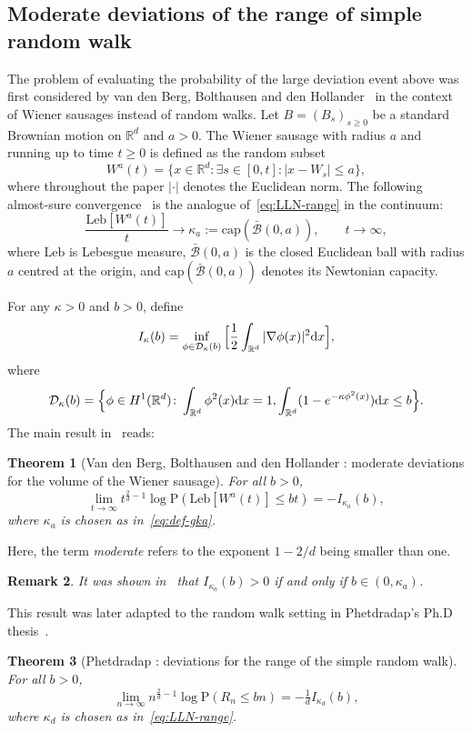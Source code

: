 \documentclass[a4paper,11pt]{amsart}
\numberwithin{equation}{section}
\newtheorem{theorem}{Theorem}[section]
\newtheorem{remark}[theorem]{Remark}
\newcommand{\bbR}{{\ensuremath{\mathbb R}} }
\newcommand{\cB}{{\ensuremath{\mathcal B}} }
\newcommand{\cD}{{\ensuremath{\mathcal D}} }
\newcommand{\gk}{\kappa}
\newcommand{\dd}{\text{\rm d}}             %
\newcommand\bP{\ensuremath{\mathrm{P}}}
\newcommand{\8}{\infty}
\newcommand{\cp}{\mathrm{cap}}
\newcommand{\beq}{\begin{equation}}
\newcommand{\eeq}{\end{equation}}
\newcommand{\leb}{\mathrm{Leb}}
\begin{document}
\subsection{Moderate deviations of the range of simple random walk}
%
\par The problem of evaluating the probability of the large deviation event above was first considered by van den Berg, Bolthausen and den Hollander~\cite{BBH2001} in the context of Wiener sausages instead of random walks. Let $B = (B_s)_{s\ge 0}$ be a standard Brownian motion on $\bbR^d$ and $a>0$. The Wiener sausage with radius $a$ and running up to time $t\ge 0$ is defined as the random subset
\beq
W^a(t) = \{x\in \bbR^d \colon \exists s\in[0,t] \colon |x - W_s| \le a\}, 
\eeq
where throughout the paper $|\cdot|$ denotes the Euclidean norm. The following almost-sure convergence~\cite{S64,WhitmanPhD64} is the analogue of~\eqref{eq:LLN-range} in the continuum:
\beq
\label{eq:def-gka}
\frac{\leb [W^a(t)]}{t} \longrightarrow \gk_a := \cp(\bar \cB(0,a)), \qquad t\to \infty,
\eeq
where $\leb$ is Lebesgue measure, $\bar \cB(0,a)$ is the closed Euclidean ball with radius $a$ centred at the origin, and $\cp(\bar \cB(0,a))$ denotes its Newtonian capacity.
%
\par For any $\gk>0$ and $b>0$, define 
\beq
\label{def:Ifunction}
I_{\gk}(b) = \inf_{\phi \in \cD_\gk(b)}
\Big[
\frac12 \int_{\bbR^d} |\nabla \phi (x)|^2 \dd x
\Big],
\eeq
where
\beq
\cD_\gk(b) = 
\Big\{
\phi \in H^1(\bbR^d) \colon
\int_{\bbR^d} \phi^2(x)\dd x = 1,
\int_{\bbR^d} (1-e^{-\gk \phi^2(x)})\dd x \le b
\Big\}.
\eeq
The main result in~\cite{BBH2001} reads:
%
\begin{theorem}[Van den Berg, Bolthausen and den Hollander : moderate deviations for the volume of the Wiener sausage]For all $b>0$,
\label{thm:BBH2001}
\beq
\lim_{t\to\infty} t^{\frac{2}{d}-1}\log \bP(\leb[W^a(t)] \le bt) = -I_{\gk_a}(b),
\eeq
where $\gk_a$ is chosen as in~\eqref{eq:def-gka}. 
\end{theorem}
%
Here, the term {\it moderate} refers to the exponent $1-2/d$ being smaller than one.
\begin{remark}
It was shown in~\cite[Theorem 3]{BBH2001} that $I_{\gk_a}(b)>0$ if and only if $b\in (0,\gk_a)$. 
\end{remark}
 This result was later adapted to the random walk setting in Phetdradap's Ph.D thesis~\cite{Phetpradap}.
\begin{theorem}[Phetdradap : deviations for the range of the simple random walk] \label{thm:MDP-rw}
For all $b>0$,
\beq\label{eq:MDP-rw}
\lim_{n\to\infty} n^{\frac{2}{d}- 1} \log \bP(R_n \le bn) = - \tfrac1d I_{\gk_d}(b),
\eeq
where $\gk_d$ is chosen as in~\eqref{eq:LLN-range}.
\end{theorem}
\end{document}

